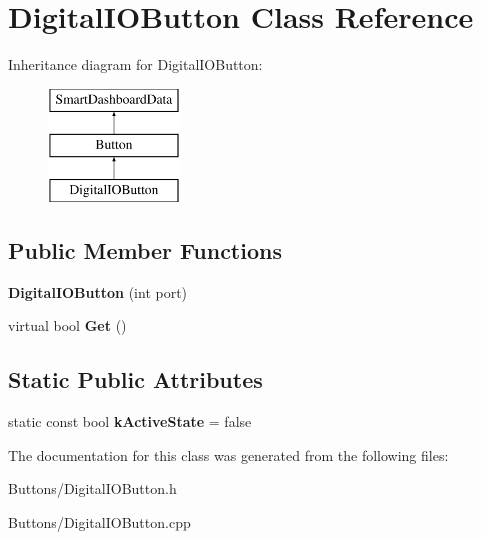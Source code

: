 \hypertarget{classDigitalIOButton}{
\section{DigitalIOButton Class Reference}
\label{classDigitalIOButton}
}
Inheritance diagram for DigitalIOButton:\begin{figure}[H]
\begin{center}
\leavevmode
\includegraphics[height=3.000000cm]{classDigitalIOButton}
\end{center}
\end{figure}
\subsection*{Public Member Functions}
\begin{DoxyCompactItemize}
\item 
\hypertarget{classDigitalIOButton_a3c0e1210134d68c2cecd2a111b7b37d2}{
{\bfseries DigitalIOButton} (int port)}
\label{classDigitalIOButton_a3c0e1210134d68c2cecd2a111b7b37d2}

\item 
\hypertarget{classDigitalIOButton_a5ea054db60ec82a921a85796be104373}{
virtual bool {\bfseries Get} ()}
\label{classDigitalIOButton_a5ea054db60ec82a921a85796be104373}

\end{DoxyCompactItemize}
\subsection*{Static Public Attributes}
\begin{DoxyCompactItemize}
\item 
\hypertarget{classDigitalIOButton_a7de4c9deab006afc48f30005c1e5b354}{
static const bool {\bfseries kActiveState} = false}
\label{classDigitalIOButton_a7de4c9deab006afc48f30005c1e5b354}

\end{DoxyCompactItemize}


The documentation for this class was generated from the following files:\begin{DoxyCompactItemize}
\item 
Buttons/DigitalIOButton.h\item 
Buttons/DigitalIOButton.cpp\end{DoxyCompactItemize}
